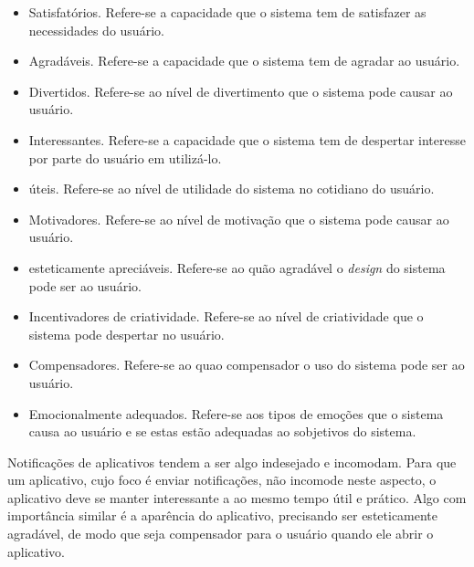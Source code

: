     \begin{itemize}
       \item Satisfatórios.
       \subitem Refere-se a capacidade que o sistema tem de satisfazer as necessidades do usuário.

       \item Agradáveis.
       \subitem Refere-se a capacidade que o sistema tem de agradar ao usuário.

       \item Divertidos.
       \subitem Refere-se ao nível de divertimento que o sistema pode causar ao usuário.

       \item Interessantes.
       \subitem Refere-se a capacidade que o sistema tem de despertar interesse por parte do usuário em utilizá-lo.

       \item úteis.
       \subitem Refere-se ao nível de utilidade do sistema no cotidiano do usuário.

       \item Motivadores.
       \subitem Refere-se ao nível de motivação que o sistema pode causar ao usuário.

       \item esteticamente apreciáveis.
       \subitem Refere-se ao quão agradável o \textit{design} do sistema pode ser ao usuário.

       \item Incentivadores de criatividade.
       \subitem Refere-se ao nível de criatividade que o sistema pode despertar no usuário.

       \item Compensadores.
       \subitem Refere-se ao quao compensador o uso do sistema pode ser ao usuário.

       \item Emocionalmente adequados.
       \subitem Refere-se aos tipos de emoções que o sistema causa ao usuário e se estas estão adequadas ao sobjetivos do sistema.
    \end{itemize}
    
    Notificações de aplicativos tendem a ser algo indesejado e incomodam. Para que um aplicativo, cujo foco é enviar notificações,
    não incomode neste aspecto, o aplicativo deve se manter interessante a ao mesmo tempo útil e prático. Algo com importância similar
    é a aparência do aplicativo, precisando ser esteticamente agradável, de modo que seja compensador para o usuário quando ele abrir 
    o aplicativo.
    